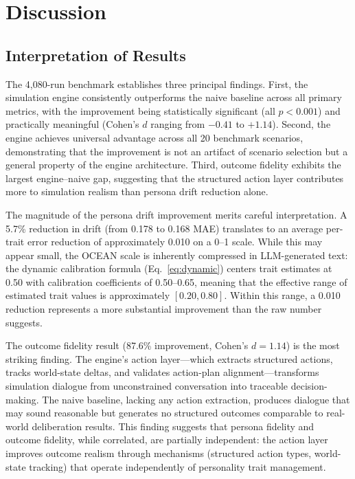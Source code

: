 \chapter{Discussion}

\section{Interpretation of Results}

The 4,080-run benchmark establishes three principal findings. First, the simulation engine consistently outperforms the naive baseline across all primary metrics, with the improvement being statistically significant (all $p < 0.001$) and practically meaningful (Cohen's $d$ ranging from $-0.41$ to $+1.14$). Second, the engine achieves universal advantage across all 20 benchmark scenarios, demonstrating that the improvement is not an artifact of scenario selection but a general property of the engine architecture. Third, outcome fidelity exhibits the largest engine--naive gap, suggesting that the structured action layer contributes more to simulation realism than persona drift reduction alone.

The magnitude of the persona drift improvement merits careful interpretation. A 5.7\% reduction in drift (from 0.178 to 0.168 MAE) translates to an average per-trait error reduction of approximately 0.010 on a 0--1 scale. While this may appear small, the OCEAN scale is inherently compressed in LLM-generated text: the dynamic calibration formula (Eq.~\ref{eq:dynamic}) centers trait estimates at 0.50 with calibration coefficients of 0.50--0.65, meaning that the effective range of estimated trait values is approximately $[0.20, 0.80]$. Within this range, a 0.010 reduction represents a more substantial improvement than the raw number suggests.

The outcome fidelity result (87.6\% improvement, Cohen's $d = 1.14$) is the most striking finding. The engine's action layer---which extracts structured actions, tracks world-state deltas, and validates action-plan alignment---transforms simulation dialogue from unconstrained conversation into traceable decision-making. The naive baseline, lacking any action extraction, produces dialogue that may sound reasonable but generates no structured outcomes comparable to real-world deliberation results. This finding suggests that persona fidelity and outcome fidelity, while correlated, are partially independent: the action layer improves outcome realism through mechanisms (structured action types, world-state tracking) that operate independently of personality trait management.


